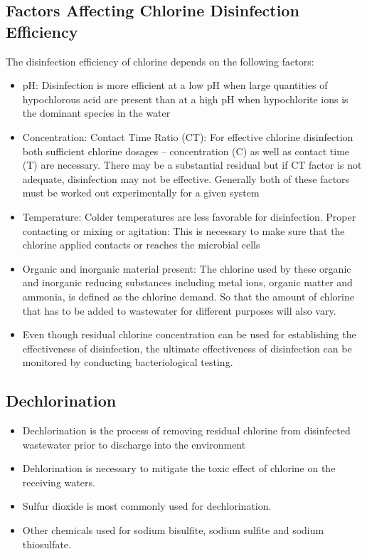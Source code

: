 \documentclass{article}
\begin{document}
\subsection{Factors Affecting Chlorine Disinfection Efficiency}

The disinfection efficiency of chlorine depends on the following factors:\\
\begin{itemize}
	\item pH:  Disinfection is more efficient at a low pH when large quantities of hypochlorous acid are present than at a high pH when hypochlorite ions is the dominant species in the water
	\item Concentration:  Contact Time Ratio (CT):  For effective chlorine disinfection both sufficient chlorine dosages – concentration (C) as well as contact time (T) are necessary.  There may be a substantial residual but if CT factor is not adequate, disinfection may not be effective. Generally both of these factors must be worked out experimentally for a given system
	\item Temperature:  Colder temperatures are less favorable for disinfection. 
Proper contacting or mixing or agitation:  This is necessary to make sure that the chlorine applied contacts or reaches the microbial cells
	\item Organic and inorganic material present:  The chlorine used by these organic and inorganic reducing substances including metal ions, organic matter and ammonia, is defined as the chlorine demand.  So that the amount of chlorine that has to be added to wastewater for different purposes will also vary.
\item Even though residual chlorine concentration can be used for establishing the effectiveness of disinfection, the ultimate effectiveness of disinfection can be monitored by conducting bacteriological testing.
\end{itemize}
		
\subsection{Dechlorination}
\begin{itemize}
\item Dechlorination is the process of removing residual chlorine from disinfected wastewater prior to discharge into the environment
\item Dehlorination is necessary to mitigate the toxic effect of chlorine on the receiving waters.  
\item Sulfur dioxide is most commonly used for dechlorination.
\item Other chemicals used for sodium bisulfite, sodium sulfite and sodium thiosulfate.
\end{itemize}
\end{document}
